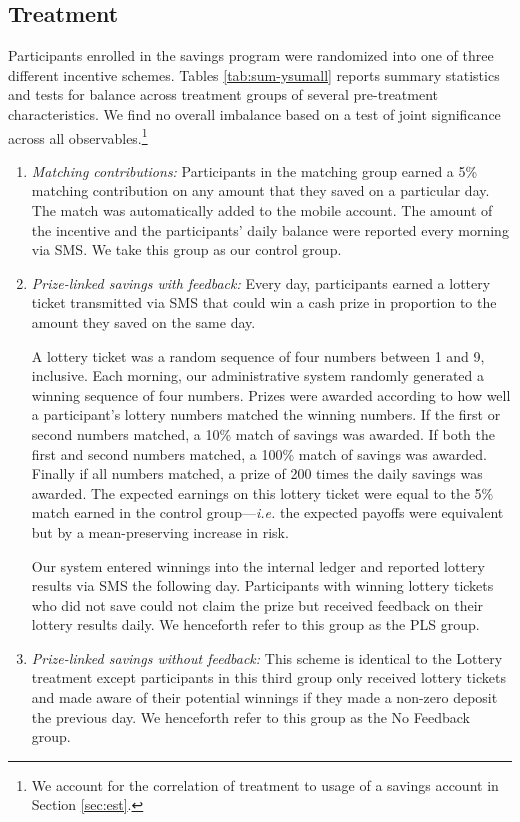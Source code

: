 \documentclass[11pt]{article}
\begin{document}
	\subsection{Treatment} \label{sec:treat}

		Participants enrolled in the savings program were randomized into one of three different incentive schemes. Tables \ref{tab:sum-ysumall} reports summary statistics and tests for balance across treatment groups of several pre-treatment characteristics. We find no overall  imbalance based on a test of joint significance across all observables.\footnote{We account for the correlation of treatment to usage of a savings account in Section \ref{sec:est}.}

		\begin{enumerate} \setlength{\itemsep}{1pt}

			\item \textit{Matching contributions:} Participants in the matching group earned a 5\% matching contribution on any amount that they saved on a particular day. The match was automatically added to the mobile account. The amount of the incentive and the participants' daily balance were reported every morning via SMS. We take this group as our control group.

			\item \textit{Prize-linked savings with feedback:} Every day, participants earned a lottery ticket transmitted via SMS that could win a cash prize in proportion to the amount they saved on the same day.

			A lottery ticket was a random sequence of four numbers between 1 and 9, inclusive. Each morning, our administrative system randomly generated a winning sequence of four numbers. Prizes were awarded according to how well a participant's lottery numbers matched the winning numbers. If the first or second numbers matched, a 10\% match of savings was awarded. If both the first and second numbers matched, a 100\% match of savings was awarded. Finally if all numbers matched, a prize of 200 times the daily savings was awarded. The expected earnings on this lottery ticket were equal to the 5\% match earned in the control group---\textit{i.e.} the expected payoffs were equivalent but by a mean-preserving increase in risk.

			Our system entered winnings into the internal ledger and reported lottery results via SMS the following day. Participants with winning lottery tickets who did not save could not claim the prize but received feedback on their lottery results daily. We henceforth refer to this group as the PLS group. 

			\item \textit{Prize-linked savings without feedback:} This scheme is identical to the Lottery treatment except participants in this third group only received lottery tickets and made aware of their potential winnings if they made a non-zero deposit the previous day. We henceforth refer to this group as the No Feedback group.

		\end{enumerate}
\end{document}
